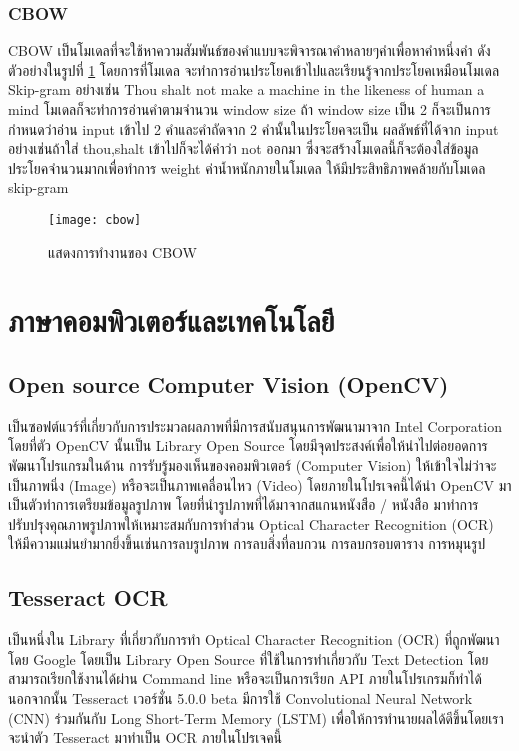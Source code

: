 \subsubsection{CBOW}
CBOW\cite{ichi} เป็นโมเดลที่จะใช้หาความสัมพันธ์ของคำแบบจะพิจารณาคำหลายๆคำเพื่อหาคำหนึ่งคำ ดังตัวอย่างในรูปที่ \ref{fig:cbow} โดยการที่โมเดล
จะทำการอ่านประโยคเข้าไปและเรียนรู้จากประโยคเหมือนโมเดล Skip-gram อย่างเช่น Thou shalt not make a machine in the likeness of human a mind 
โมเดลก็จะทำการอ่านคำตามจำนวน window size ถ้า window size เป็น 2 ก็จะเป็นการกำหนดว่าอ่าน input เข้าไป 2 คำและคำถัดจาก 2 คำนั้นในประโยคจะเป็น
ผลลัพธ์ที่ได้จาก input  อย่างเช่นถ้าใส่ thou,shalt เข้าไปก็จะได้คำว่า not ออกมา ซึ่งจะสร้างโมเดลนี้ก็จะต้องใส่ข้อมูลประโยคจำนวนมากเพื่อทำการ weight 
ค่าน้ำหนักภายในโมเดล ให้มีประสิทธิภาพคล้ายกับโมเดล skip-gram

\begin{figure}[H]
    \centering
    \texttt{[image: cbow]}
    \caption{แสดงการทำงานของ CBOW \cite{ichi}}\label{fig:cbow}
\end{figure}

\section{ภาษาคอมพิวเตอร์และเทคโนโลยี }

\subsection{Open source Computer Vision (OpenCV)}

เป็นซอฟต์แวร์ที่เกี่ยวกับการประมวลผลภาพที่มีการสนับสนุนการพัฒนามาจาก Intel Corporation โดยที่ตัว OpenCV นั้นเป็น Library Open Source  โดยมีจุดประสงค์เพื่อให้นำไปต่อยอดการพัฒนาโปรแกรมในด้าน การรับรู้มองเห็นของคอมพิวเตอร์ (Computer Vision) ให้เข้าใจไม่ว่าจะเป็นภาพนิ่ง (Image) หรือจะเป็นภาพเคลื่อนไหว (Video) โดยภายในโปรเจคนี้ได้นำ OpenCV มาเป็นตัวทำการเตรียมข้อมูลรูปภาพ โดยที่นำรูปภาพที่ได้มาจากสแกนหนังสือ / หนังสือ มาทำการปรับปรุงคุณภาพรูปภาพให้เหมาะสมกับการทำส่วน Optical Character Recognition (OCR) ให้มีความแม่นยำมากยิ่งขึ้นเช่นการลบรูปภาพ การลบสิ่งที่ลบกวน การลบกรอบตาราง การหมุนรูป 

\subsection{Tesseract OCR}

เป็นหนึ่งใน Library ที่เกี่ยวกับการทำ Optical Character Recognition (OCR) ที่ถูกพัฒนาโดย Google โดยเป็น Library Open Source ที่ใช้ในการทำเกี่ยวกับ Text Detection โดยสามารถเรียกใช้งานได้ผ่าน Command line หรือจะเป็นการเรียก API ภายในโปรเกรมก็ทำได้นอกจากนั้น Tesseract เวอร์ชั่น 5.0.0 beta มีการใช้ Convolutional Neural Network (CNN) \cite{keiron} ร่วมกันกับ Long Short-Term Memory (LSTM) เพื่อให้การทำนายผลได้ดีขึ้นโดยเราจะนำตัว Tesseract มาทำเป็น OCR ภายในโปรเจคนี้

